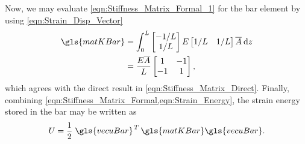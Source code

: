 Now, we may evaluate \cref{eqn:Stiffness_Matrix_Formal_1} for the bar element by using \cref{eqn:Strain_Disp_Vector}
\begin{equation}	\label{eqn:Stiffness_Matrix_Formal} 
	\begin{aligned}
		\gls{matKBar} &= \int_0^L
		\begin{bmatrix} -1/L \\ 1/L \end{bmatrix} E 
			\begin{bmatrix} 1/L	& 1/L \end{bmatrix} \overline{A} \dd z \\
		&= \frac{ E \overline{A} }{ L } \begin{bmatrix} 1 & -1	\\ -1 &	1 \end{bmatrix},
	\end{aligned}
\end{equation}
%
which agrees with the direct result in \cref{eqn:Stiffness_Matrix_Direct}. Finally, combining
\cref{eqn:Stiffness_Matrix_Formal,eqn:Strain_Energy}, the strain energy stored in the bar may be written as
\begin{equation}
	U = \frac{1}{2} \left. \gls{vecuBar} \right.^T \gls{matKBar} \gls{vecuBar}.
\end{equation}
%